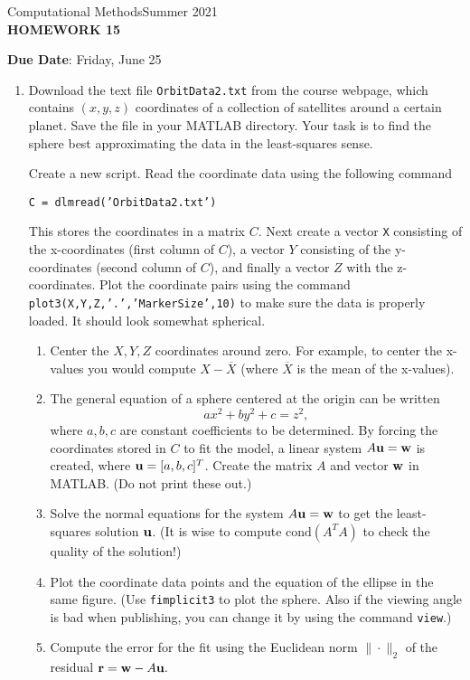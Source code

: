 \documentclass[12pt]{article}
\begin{document}
\begin{center}
Computational Methods\qquad Summer 2021
\\

\textbf{\large HOMEWORK 15}\\
\end{center}
\noindent \textbf{Due Date}: Friday, June 25\\

\begin{enumerate}
\item Download the text file \texttt{OrbitData2.txt} from the course webpage, which contains $(x,y,z)$ coordinates of a collection of satellites around a certain planet. Save the file in your MATLAB directory. Your task is to find the sphere best approximating the data in the least-squares sense.

Create a new script. Read the coordinate data using the following command
\begin{center}
\texttt{C = dlmread('OrbitData2.txt')}
\end{center}
This stores the coordinates in a matrix $C$. Next create a vector \texttt{X} consisting of the x-coordinates (first column of $C$), a vector $Y$ consisting of the y-coordinates (second column of $C$), and finally a vector $Z$ with the z-coordinates. Plot the coordinate pairs using the command \texttt{plot3(X,Y,Z,'.','MarkerSize',10)} to make sure the data is properly loaded. It should look somewhat spherical.
	\begin{enumerate}
	\item Center the $X,Y,Z$ coordinates around zero. For example, to center the x-values you would compute $X-\overline{X}$ (where $\overline{X}$ is the mean of the x-values).
	\item The general equation of a sphere centered at the origin can be written
	\[ax^2 +by^2 + c = z^2,\]
	where $a,b,c$ are constant coefficients to be determined. By forcing the coordinates stored in $C$ to fit the model, a linear system $A{\bf{u}} = {\bf{w}}$ is created, where ${\bf{u}} = [a,b,c]^T$. Create the matrix $A$ and vector ${\bf{w}}$ in MATLAB. (Do not print these out.)
	\item Solve the normal equations for the system $A{\bf{u}} = {\bf{w}}$ to get the least-squares solution ${\bf{u}}$. (It is wise to compute $\mathrm{cond}(A^T A)$ to check the quality of the solution!)
	\item Plot the coordinate data points and the equation of the ellipse in the same figure. (Use \texttt{fimplicit3} to plot the sphere. Also if the viewing angle is bad when publishing, you can change it by using the command \texttt{view}.)
	\item Compute the error for the fit using the Euclidean norm $\|\cdot\|_2$ of the residual ${\bf{r}} = {\bf{w}} - A{\bf{u}}.$
\end{enumerate}
\end{enumerate}
\end{document}
